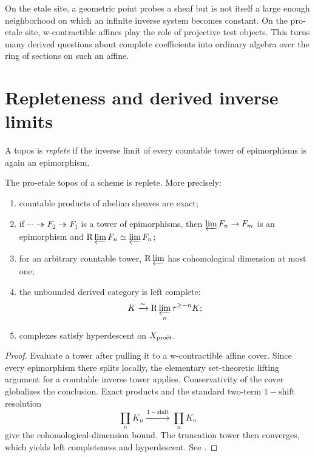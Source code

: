 \begin{proetalebox}
On the etale site, a geometric point probes a sheaf but is not itself a large
enough neighborhood on which an infinite inverse system becomes constant.
On the pro-etale site, w-contractible affines play the role of projective
test objects.  This turns many derived questions about complete coefficients
into ordinary algebra over the ring of sections on such an affine.
\end{proetalebox}

\section{Repleteness and derived inverse limits}

\begin{definition}
A topos is \emph{replete} if the inverse limit of every countable tower of
epimorphisms is again an epimorphism.
\end{definition}

\begin{theorem}
\label{thm:proetale-repleteness}
The pro-etale topos of a scheme is replete.  More precisely:
\begin{enumerate}
\item countable products of abelian sheaves are exact;
\item if \(\cdots\twoheadrightarrow F_2\twoheadrightarrow F_1\) is a tower
      of epimorphisms, then \(\varprojlim F_n\to F_m\) is an epimorphism and
      \(\mathrm R\varprojlim F_n\simeq\varprojlim F_n\);
\item for an arbitrary countable tower, \(\mathrm R\varprojlim\) has cohomological
      dimension at most one;
\item the unbounded derived category is left complete:
      \[
        K\xrightarrow{\sim}
        \mathrm R\varprojlim_n \tau^{\ge -n}K;
      \]
\item complexes satisfy hyperdescent on \(X_{\mathrm{pro\acute et}}\).
\end{enumerate}
\end{theorem}

\begin{proof}
Evaluate a tower after pulling it to a w-contractible affine cover.  Since
every epimorphism there splits locally, the elementary set-theoretic lifting
argument for a countable inverse tower applies.  Conservativity of the cover
globalizes the conclusion.  Exact products and the standard two-term
\(1-\mathrm{shift}\) resolution
\[
  \prod_n K_n \xrightarrow{\,1-\mathrm{shift}\,} \prod_n K_n
\]
give the cohomological-dimension bound.  The truncation tower then converges,
which yields left completeness and hyperdescent.  See
\cite[Propositions~3.1.9--3.1.11, 3.3.3, and 3.3.6]{BhattScholzeProEtale}.
\end{proof}

